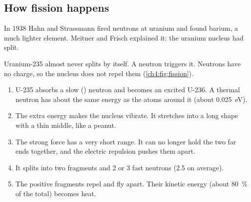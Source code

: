 \begin{keywords}
\end{keywords}

\subsection{How fission happens}

In 1938 Hahn and Strassmann fired neutrons at uranium and found barium, a much
lighter element. Meitner and Frisch explained it: the uranium nucleus had split.

Uranium-235 almost never splits by itself. A neutron triggers it. Neutrons have no
charge, so the nucleus does not repel them (\cref{ch4:fig:fission}).
\begin{enumerate}
  \item U-235 absorbs a slow () neutron and becomes an excited U-236. A
        thermal neutron has about the same energy as the atoms around it (about
        \qty{0.025}{eV}).
  \item The extra energy makes the nucleus vibrate. It stretches into a long shape
        with a thin middle, like a peanut.
  \item The strong force has a very short range. It can no longer hold the two far
        ends together, and the electric repulsion pushes them apart.
  \item It splits into two fragments and 2 or 3 fast neutrons (2.5 on average).
  \item The positive fragments repel and fly apart. Their kinetic energy (about
        \qty{80}{\percent} of the total) becomes heat.
\end{enumerate}

